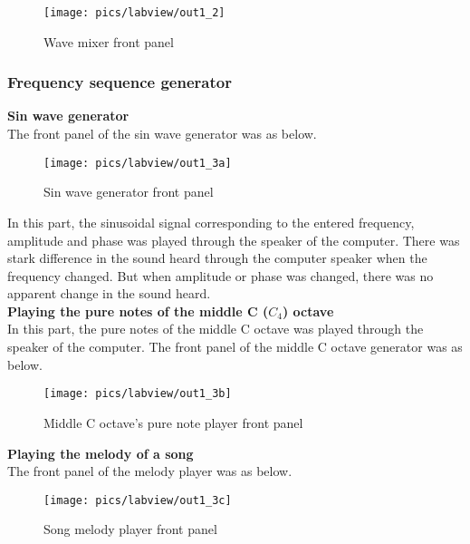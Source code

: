 \pagebreak

\begin{figure}[!h]
	\centering
	\texttt{[image: pics/labview/out1\_2]}
	\caption{Wave mixer front panel}
	\label{fig:out12}
\end{figure}

\pagebreak

\subsubsection{Frequency sequence generator}

\textbf{Sin wave generator}\\

\noindent
The front panel of the sin wave generator was as below.

\begin{figure}[!h]
	\centering
	\texttt{[image: pics/labview/out1\_3a]}
	\caption{Sin wave generator front panel}
	\label{fig:out13a}
\end{figure}


\noindent
In this part, the sinusoidal signal corresponding to the entered frequency, amplitude and phase was played through the speaker of the computer. There was  stark difference in the sound heard through the computer speaker when the frequency changed. But when amplitude or phase was changed, there was no apparent change in the sound heard.\\


\noindent
\textbf{Playing the pure notes of the middle C ($ C_{4} $) octave}\\

\noindent
In this part, the pure notes of the middle C octave was played through the speaker of the computer. The front panel of the middle C octave generator was as below.

\begin{figure}[!h]
	\centering
	\texttt{[image: pics/labview/out1\_3b]}
	\caption{Middle C octave's pure note player front panel}
	\label{fig:out13b}
\end{figure}

\noindent
\textbf{Playing the melody of a song}\\

\noindent
The front panel of the melody player was as below.

\begin{figure}[!h]
	\centering
	\texttt{[image: pics/labview/out1\_3c]}
	\caption{Song melody player front panel}
	\label{fig:out13c}
\end{figure}

